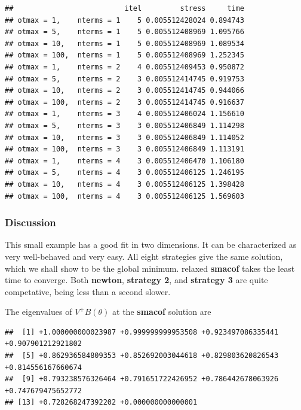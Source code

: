 \documentclass[
  12pt,
]{article}
\newenvironment{Shaded}{\begin{snugshade}}{\end{snugshade}}
\newcommand{\AttributeTok}[1]{\textcolor[rgb]{0.13,0.29,0.53}{#1}}
\newcommand{\DecValTok}[1]{\textcolor[rgb]{0.00,0.00,0.81}{#1}}
\newcommand{\FunctionTok}[1]{\textcolor[rgb]{0.13,0.29,0.53}{\textbf{#1}}}
\newcommand{\NormalTok}[1]{#1}
\newcommand{\OtherTok}[1]{\textcolor[rgb]{0.56,0.35,0.01}{#1}}
\newcommand{\SpecialCharTok}[1]{\textcolor[rgb]{0.81,0.36,0.00}{\textbf{#1}}}
\begin{document}
\begin{Shaded}
\end{Shaded}

\begin{verbatim}
##                          itel         stress     time
## otmax = 1,    nterms = 1    5 0.005512428024 0.894743
## otmax = 5,    nterms = 1    5 0.005512408969 1.095766
## otmax = 10,   nterms = 1    5 0.005512408969 1.089534
## otmax = 100,  nterms = 1    5 0.005512408969 1.252345
## otmax = 1,    nterms = 2    4 0.005512409453 0.950872
## otmax = 5,    nterms = 2    3 0.005512414745 0.919753
## otmax = 10,   nterms = 2    3 0.005512414745 0.944066
## otmax = 100,  nterms = 2    3 0.005512414745 0.916637
## otmax = 1,    nterms = 3    4 0.005512406024 1.156610
## otmax = 5,    nterms = 3    3 0.005512406849 1.114298
## otmax = 10,   nterms = 3    3 0.005512406849 1.114052
## otmax = 100,  nterms = 3    3 0.005512406849 1.113191
## otmax = 1,    nterms = 4    3 0.005512406470 1.106180
## otmax = 5,    nterms = 4    3 0.005512406125 1.246195
## otmax = 10,   nterms = 4    3 0.005512406125 1.398428
## otmax = 100,  nterms = 4    3 0.005512406125 1.569603
\end{verbatim}

\subsubsection{Discussion}\label{discussion}

This small example has a good fit in two dimensions. It can be characterized as very well-behaved and very easy.
All eight strategies give the same solution, which we shall show to be the global minimum.
relaxed \textbf{smacof} takes the least time to converge. Both \textbf{newton}, \textbf{strategy 2}, and
\textbf{strategy 3} are quite competative, being less than a second slower.

The eigenvalues of \(V^+B(\theta)\) at the \textbf{smacof} solution are

\begin{verbatim}
##  [1] +1.000000000023987 +0.999999999953508 +0.923497086335441 +0.907901212921802
##  [5] +0.862936584809353 +0.852692003044618 +0.829803620826543 +0.814556167660674
##  [9] +0.793238576326464 +0.791651722426952 +0.786442678063926 +0.747679475652772
## [13] +0.728268247392202 +0.000000000000001
\end{verbatim}
\end{document}
